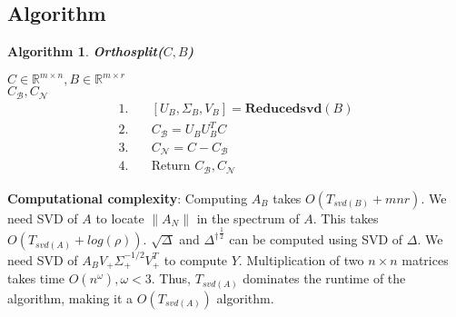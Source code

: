 \documentclass[11pt]{article}
\newtheorem{alg}{Algorithm}
\def\reals{\mathbb{R}}
\newcommand{\norm}[1]{\left\|#1\right\|}
\newcommand{\B}{\mathcal{B}}
\newcommand{\N}{\mathcal{N}}
\begin{document}
\subsection{Algorithm}
\begin{framed}
\begin{alg}\label{alg:orthosplit}
{\bf Orthosplit($C, B$) }
\end{alg}
 $C \in \reals^{m \times n}, B \in \reals^{m \times r}$\\
 $C_{\B}, C_{\N}$
%
\begin{align*}
1. \quad& [U_B, \Sigma_B, V_B] = \textbf{Reducedsvd}(B) \\
2. \quad& C_{\B} = U_B U_B ^T C  \\
3. \quad& C_{\N} = C - C_{\B}  \\
4. \quad& \text{Return } C_{\B}, C_{\N} 
\end{align*}
%
\end{framed}




\noindent \textbf{Computational complexity}: \quad Computing $A_B$ takes $O(T_{svd(B)}+mnr)$. We need SVD of $A$ to locate $\norm{A_N}$ in the spectrum of $A$. This takes $O(T_{svd(A)}+ log (\rho))$. $\sqrt{\Delta}$ and ${{\Delta}^{\dagger}}^{\frac{1}{2}}$ can be computed using SVD of $\Delta$. We need SVD of $A_BV_+{\Sigma}^{-1/2}_+V_+^T$ to compute $Y$. Multiplication of two $n \times n$ matrices takes time $O(n^\omega), \omega < 3$. Thus, $T_{svd(A)}$ dominates the runtime of the algorithm, making it a $O(T_{svd(A)})$ algorithm. \\
\end{document}
